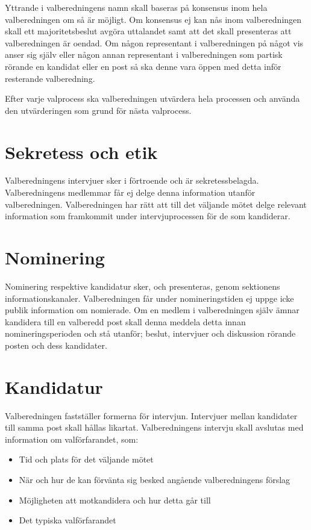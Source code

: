 \documentclass{dsekprotokoll}
\begin{document}
Yttrande i valberedningens namn skall baseras på konsensus inom hela valberedningen om
så är möjligt. Om konsensus ej kan nås inom valberedningen skall ett majoritetsbeslut avgöra
uttalandet samt att det skall presenteras att valberedningen är oendad.
Om någon representant i valberedningen på något vis anser sig själv eller någon annan representant i valberedningen som partisk rörande en kandidat eller en post så ska denne vara
öppen med detta inför resterande valberedning.


Efter varje valprocess ska valberedningen utvärdera hela processen och använda den utvärderingen som grund för nästa valprocess.

\section{Sekretess och etik}
Valberedningens intervjuer sker i förtroende och är sekretessbelagda. Valberedningens medlemmar får ej delge denna information utanför valberedningen. Valberedningen har rätt att till
det väljande mötet delge relevant information som framkommit under intervjuprocessen för
de som kandiderar.

\section{Nominering}
Nominering respektive kandidatur sker, och presenteras, genom sektionens informationskanaler. Valberedningen får under nomineringstiden ej uppge icke publik information om nomierade. Om en medlem i valberedningen själv ämnar kandidera till en valberedd post skall
denna meddela detta innan nomineringsperioden och stå utanför; beslut, intervjuer och diskussion rörande posten och dess kandidater.

\section{Kandidatur}
Valberedningen fastställer formerna för intervjun. Intervjuer mellan kandidater till samma post
skall hållas likartat. Valberedningens intervju skall avslutas med information om valförfarandet, som:
\begin{itemize}
	\item Tid och plats för det väljande mötet
	\item När och hur de kan förvänta sig besked angående valberedningens förslag
	\item Möjligheten att motkandidera och hur detta går till
	\item Det typiska valförfarandet
\end{itemize}
\end{document}
